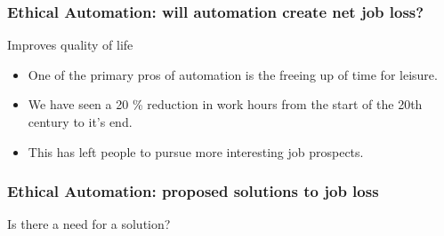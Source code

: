 \begin{frame}
	\frametitle{Ethical Automation: will automation create net job loss? }
	{\Large Improves quality of life}
	\begin{itemize}
	\item One of the primary pros of automation is the freeing up of time for leisure.
	\item  We have seen a 20 \% reduction in work hours from the start of the 20th century to it's end.
	\item This has left people to pursue more interesting job prospects.
	\end{itemize}
\end{frame}
\begin{frame}
\frametitle{Ethical Automation: proposed solutions to job loss}
{\Large Is there a need for a solution?}
\end{frame}

